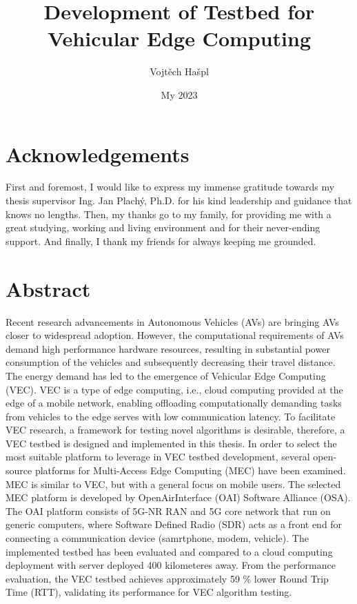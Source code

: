 \documentclass[12pt,a4paper,twoside]{report}
\title {Development of Testbed for Vehicular Edge Computing}
\author{Vojtěch Hašpl}
\date{My 2023}
\begin{document}
\maketitle




\makestatement




\chapter*{Acknowledgements}
First and foremost, I would like to express my immense gratitude towards my thesis supervisor Ing. Jan Plachý, Ph.D. for his kind leadership and guidance that knows no lengths. Then, my thanks go to my family, for providing me with a great studying, working and living environment and for their never-ending support. And finally, I thank my friends for always keeping me grounded. 


\chapter*{Abstract}
Recent research advancements in Autonomous Vehicles (AVs) are bringing AVs closer to widespread adoption. However, the computational requirements of AVs demand high performance hardware resources, resulting in substantial power consumption of the vehicles and subsequently decreasing their travel distance. The energy demand has led to the emergence of Vehicular Edge Computing (VEC). VEC is a type of edge computing, i.e., cloud computing provided at the edge of a mobile network, enabling offloading computationally demanding tasks from vehicles to the edge serves with low communication latency. To facilitate VEC research, a framework for testing novel algorithms is desirable, therefore, a VEC testbed is designed and implemented in this thesis. In order to select the most suitable platform to leverage in VEC testbed development, several open-source platforms for Multi-Access Edge Computing (MEC) have been examined. MEC is similar to VEC, but with a general focus on mobile users. The selected MEC platform is developed by OpenAirInterface (OAI) Software Alliance (OSA). The OAI platform consists of 5G-NR RAN and 5G core network that run on generic computers, where Software Defined Radio (SDR) acts as a front end for connecting a communication device (samrtphone, modem, vehicle). The implemented testbed has been evaluated and compared to a cloud computing deployment with  server deployed 400 kilometeres away. From the performance evaluation, the VEC testbed achieves approximately 59 \% lower Round Trip Time (RTT), validating its performance for VEC algorithm testing.
	
\end{document}
